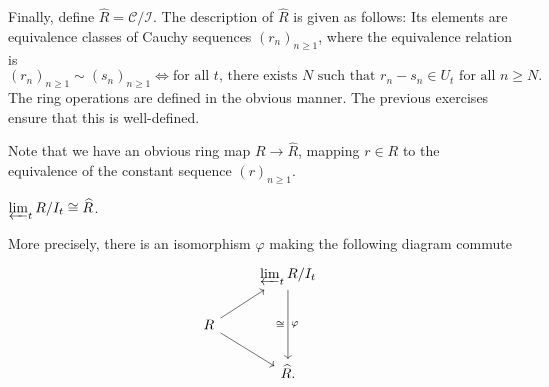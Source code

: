 \documentclass[12pt]{article}
\begin{document}
Finally, define $\widehat{R} = \mathcal{C}/\mathcal{I}$. The description of $\widehat{R}$ is given as follows: Its elements are equivalence classes of Cauchy sequences $(r_{n})_{n \ge 1}$, where the equivalence relation is
\begin{equation*} 
	(r_{n})_{n \ge 1} \sim (s_{n})_{n \ge 1} \Leftrightarrow \text{for all $t$, there exists $N$ such that $r_{n} - s_{n} \in U_{t}$ for all $n \ge N$}.
\end{equation*}
The ring operations are defined in the obvious manner. The previous exercises ensure that this is well-defined.

Note that we have an obvious ring map $R \to \widehat{R}$, mapping $r \in R$ to the equivalence of the constant sequence $(r)_{n \ge 1}$.

\begin{thm} \label{thm:equivalence-of-completions}
	$\varprojlim_{t} R/I_{t} \cong \widehat{R}$.

	More precisely, there is an isomorphism $\varphi$ making the following diagram commute
	\begin{equation*} 
		\begin{tikzcd}
			& \limit_{t} R/I_{t} \arrow[dd, "\cong"', "\varphi"] \\
			R \arrow[ru] \arrow[rd] & \\
			& \widehat{R}.
		\end{tikzcd}
	\end{equation*}
\end{thm}
\end{document}
